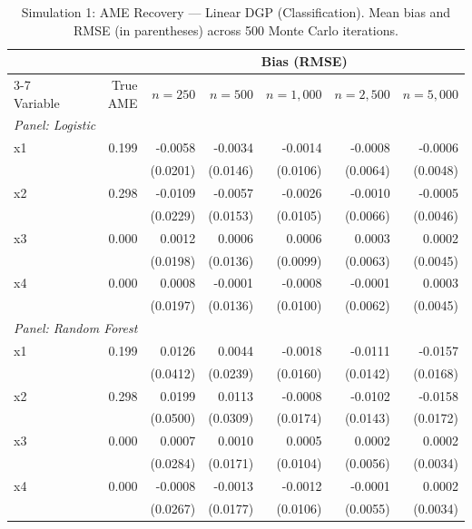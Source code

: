 \documentclass[12pt,a4paper]{article}
\numberwithin{equation}{section}
\theoremstyle{plain}
\theoremstyle{definition}
\begin{document}
	\begin{table}[htbp]
		\centering
		\small
		\begin{threeparttable}
			\caption{Simulation 1: AME Recovery --- Linear DGP (Classification). Mean bias and RMSE (in parentheses) across 500 Monte Carlo iterations.}
			\label{tab:sim1_classification_linear}
			\begin{tabular}{lrrrrrr}
				\toprule
				& & \multicolumn{5}{c}{Bias (RMSE)} \\
				\cmidrule(lr){3-7}
				Variable & True AME & $n=250$ & $n=500$ & $n=1,000$ & $n=2,500$ & $n=5,000$ \\
				\midrule
				\multicolumn{7}{l}{\textit{Panel: Logistic}} \\
				\quad x1 & 0.199 & -0.0058 & -0.0034 & -0.0014 & -0.0008 & -0.0006 \\
				&  & (0.0201) & (0.0146) & (0.0106) & (0.0064) & (0.0048) \\
				\quad x2 & 0.298 & -0.0109 & -0.0057 & -0.0026 & -0.0010 & -0.0005 \\
				&  & (0.0229) & (0.0153) & (0.0105) & (0.0066) & (0.0046) \\
				\quad x3 & 0.000 & 0.0012 & 0.0006 & 0.0006 & 0.0003 & 0.0002 \\
				&  & (0.0198) & (0.0136) & (0.0099) & (0.0063) & (0.0045) \\
				\quad x4 & 0.000 & 0.0008 & -0.0001 & -0.0008 & -0.0001 & 0.0003 \\
				&  & (0.0197) & (0.0136) & (0.0100) & (0.0062) & (0.0045) \\
				\midrule
				\multicolumn{7}{l}{\textit{Panel: Random Forest}} \\
				\quad x1 & 0.199 & 0.0126 & 0.0044 & -0.0018 & -0.0111 & -0.0157 \\
				&  & (0.0412) & (0.0239) & (0.0160) & (0.0142) & (0.0168) \\
				\quad x2 & 0.298 & 0.0199 & 0.0113 & -0.0008 & -0.0102 & -0.0158 \\
				&  & (0.0500) & (0.0309) & (0.0174) & (0.0143) & (0.0172) \\
				\quad x3 & 0.000 & 0.0007 & 0.0010 & 0.0005 & 0.0002 & 0.0002 \\
				&  & (0.0284) & (0.0171) & (0.0104) & (0.0056) & (0.0034) \\
				\quad x4 & 0.000 & -0.0008 & -0.0013 & -0.0012 & -0.0001 & 0.0002 \\
				&  & (0.0267) & (0.0177) & (0.0106) & (0.0055) & (0.0034) \\
				\midrule

\end{tabular}
\end{threeparttable}
\end{table}
\end{document}
